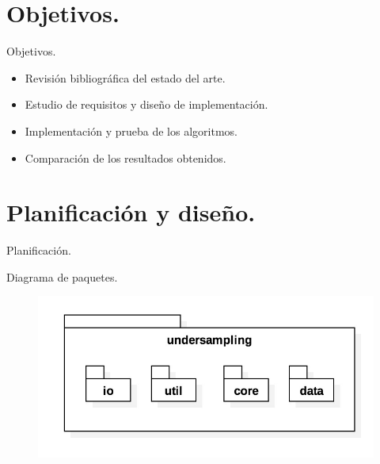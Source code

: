 \documentclass[10pt]{beamer}
\begin{document}
\section{Objetivos.}

\begin{frame}[fragile]{Objetivos.}
	\begin{itemize}
		\item Revisión bibliográfica del estado del arte.
		\item Estudio de requisitos y diseño de implementación.
		\item Implementación y prueba de los algoritmos.
		\item Comparación de los resultados obtenidos. 
	\end{itemize}
\end{frame}

\section{Planificación y diseño.}

\begin{frame}[fragile]{Planificación.}
	\begin{figure}
	\centering
    	\scalebox{.85}{}
	\end{figure}
\end{frame}

\begin{frame}[fragile]{Diagrama de paquetes.}
	\begin{figure}[H]
	\centering
	\includegraphics[width=\linewidth]{./imagenes/3_paquetes}
	\end{figure}
\end{frame}
\end{document}
